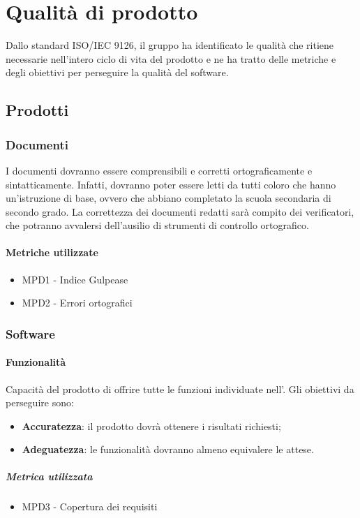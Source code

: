 \section{Qualità di prodotto}
Dallo standard ISO/IEC 9126, il gruppo \Gruppo{} ha identificato le qualità che ritiene necessarie nell'intero ciclo di vita del prodotto e ne ha tratto delle metriche e degli obiettivi per perseguire la qualità del software. 
\subsection{Prodotti}
\subsubsection{Documenti}
I documenti dovranno essere comprensibili e corretti ortograficamente e sintatticamente. Infatti, dovranno poter essere letti da tutti coloro che hanno un'istruzione di base, ovvero che abbiano completato la scuola secondaria di secondo grado. La correttezza dei documenti redatti sarà compito dei verificatori, che potranno avvalersi dell'ausilio di strumenti di controllo ortografico. 

\paragraph{Metriche utilizzate}
\begin{itemize}
\item MPD1 - Indice Gulpease
\item MPD2 - Errori ortografici
\end{itemize} 
\subsubsection{Software}
\paragraph{Funzionalità}
Capacità del prodotto di offrire tutte le funzioni individuate nell'\AdRv{}. Gli obiettivi da perseguire sono:
\begin{itemize}
\item \textbf{Accuratezza}: il prodotto dovrà ottenere i risultati richiesti;
\item \textbf{Adeguatezza}: le funzionalità dovranno almeno equivalere le attese.
\end{itemize}
\subparagraph{Metrica utilizzata}
\begin{itemize}
\item MPD3 - Copertura dei requisiti
\end{itemize}
